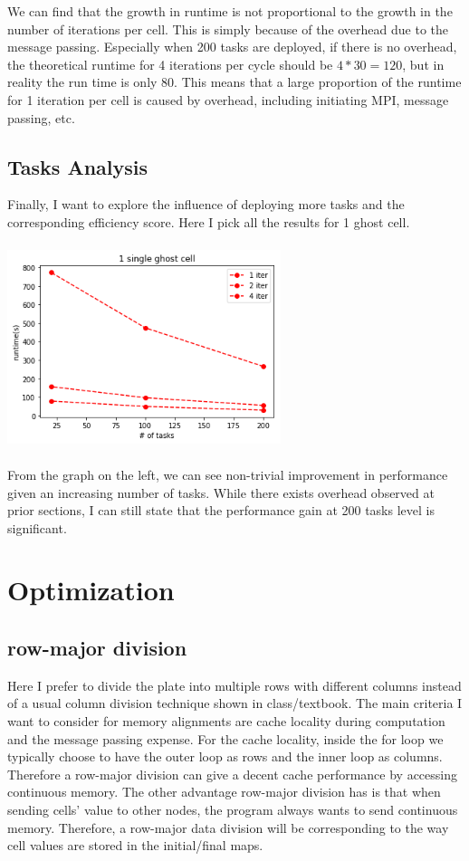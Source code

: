 \documentclass{cs4444}
\begin{document}
We can find that the growth in runtime is not proportional to  the growth in the number of iterations per cell. This is simply because of the overhead due to the message passing. Especially when 200 tasks are deployed, if there is no overhead, the theoretical runtime for 4 iterations per cycle should be $4 * 30 = 120$, but in reality the run time is only $80$. This means that a large proportion of the runtime for 1 iteration per cell is caused by overhead, including initiating MPI, message passing, etc.

\subsection{Tasks Analysis}

Finally, I want to explore the influence of deploying more tasks and the corresponding efficiency score. Here I pick all the results for 1 ghost cell.

\begin{center}
\includegraphics[width=8cm, height=6cm]{task_vs_time}
\end{center}

From the graph on the left, we can see non-trivial improvement in performance given an increasing number of tasks. While there exists overhead observed at prior sections, I can still state that the performance gain at 200 tasks level is significant.

\section{Optimization} 

\subsection{row-major division}
Here I prefer to divide the plate into multiple rows with different columns instead of a usual column division technique shown in class/textbook. The main criteria I want to consider for memory alignments are cache locality during computation and the message passing expense. For the cache locality, inside the for loop we typically choose to have the outer loop as rows and the inner loop as columns. Therefore a row-major division can give a decent cache performance by accessing continuous memory. The other advantage row-major division has is that when sending cells' value to other nodes, the program always wants to send continuous memory. Therefore, a row-major data division will be corresponding to the way cell values are stored in the initial/final maps. 
\end{document}
